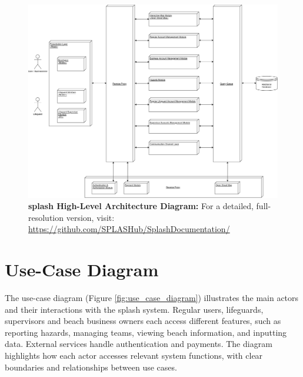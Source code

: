 \begin{figure}[H]
      \centering
      \includegraphics[width=16cm]{figs/diag_high_level.png}
       \caption{ \textbf{\ac{splash} High-Level Architecture Diagram:} For a detailed, full-resolution version, visit: 
       \url{https://github.com/SPLASHub/SplashDocumentation/}}
       \label{fig:high_level_diag}
\end{figure}

\newpage
\section{Use-Case Diagram}

The use-case diagram (Figure \ref{fig:use_case_diagram}) illustrates the main actors and their interactions with the \ac{splash} system. Regular users, lifeguards, supervisors and beach business owners each access different features, such as reporting hazards, managing teams, viewing beach information, and inputting data. External services handle authentication and payments. The diagram highlights how each actor accesses relevant system functions, with clear boundaries and relationships between use cases.


